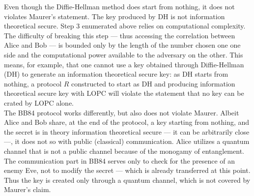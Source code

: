 	 Even though the Diffie-Hellman method does start from nothing, it does not violates Maurer's statement.
	 The key produced by DH is not information theoretical secure. 
	 Step $3$ enumerated above relies on computational complexity.
	 The difficulty of breaking this step --- thus accessing the correlation between Alice and Bob --- is bounded only by the length of the number chosen one one side and the computational power available to the adversary on the other.
	 This means, for example, that one cannot use a key obtained through Diffie-Hellman (DH) to generate an information theoretical secure key: 
	 as DH starts from nothing, a protocol $R$ constructed to start as DH and producing information theoretical secure key with LOPC will violate the statement that no key can be crated by LOPC alone.\\
	 The BB84 protocol works differently, but also does not violate Maurer.
	 Albeit Alice and Bob share, at the end of the protocol, a key starting from nothing, and the secret is in theory information theoretical secure --- it can be arbitrarily close ---, it does not so with public (classical) communication.
	 Alice utilizes a quantum channel that is not a public channel because of the monogamy of entanglement.
	 The communication part in BB84 serves only to check for the presence of an enemy Eve, not to modify the secret --- which is already transferred at this point.  
	 Thus the key is created only through a quantum channel, which is not covered by Maurer's claim.\\

%	
	 
